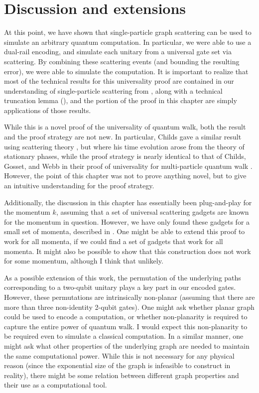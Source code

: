 \documentclass[../thesis-main/thesis-main]{subfiles}
\begin{document}
\section{Discussion and extensions}

At this point, we have shown that single-particle graph scattering can be used to simulate an arbitrary quantum computation.  In particular, we were able to use a dual-rail encoding, and simulate each unitary from a universal gate set via scattering.  By combining these scattering events (and bounding the resulting error), we were able to simulate the computation.  It is important to realize that most of the technical results for this universality proof are contained in our understanding of single-particle scattering from , along with a technical truncation lemma (), and the portion of the proof in this chapter are simply applications of those results.

While this is a novel proof of the universality of quantum walk, both the result and the proof strategy are not new.  In particular, Childs gave a similar result using scattering theory \cite{Chi09}, but where his time evolution arose from the theory of stationary phases, while the proof strategy is nearly identical to that of Childs, Gosset, and Webb in their proof of universality for multi-particle quantum walk \cite{MPQW}.  However, the point of this chapter was not to prove anything novel, but to give an intuitive understanding for the proof strategy.

Additionally, the discussion in this chapter has essentially been plug-and-play for the momentum $k$, assuming that a set of universal scattering gadgets are known for the momentum in question.  However, we have only found these gadgets for a small set of momenta, described in .  One might be able to extend this proof to work for all momenta, if we could find a set of gadgets that work for all momenta.  It might also be possible to show that this construction does not work for some momentum, although I think that unlikely.

As a possible extension of this work, the permutation of the underlying paths corresponding to a two-qubit unitary plays a key part in our encoded gates.  However, these permutations are intrinsically non-planar (assuming that there are more than three non-identity 2-qubit gates).  One might ask whether  planar graph could be used to encode a computation, or whether non-planarity is required to capture the entire power of quantum walk.  I would expect this non-planarity to be required even to simulate a classical computation.  In a similar manner, one might ask what other properties of the underlying graph are needed to maintain the same computational power.  While this is not necessary for any physical reason (since the exponential size of the graph is infeasible to construct in reality), there might be some relation between different graph properties and their use as a computational tool.
\end{document}

